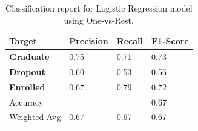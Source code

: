 \documentclass[12pt]{article}
\begin{document}
\begin{table}[h!]
  \renewcommand{\arraystretch}{1.2} %
  \centering
  \begin{tabular}{ | m{2.5cm} || m{2cm} | m{2cm} | m{2cm} | } 
    \hline
    \textbf{Target} & \textbf{Precision} & \textbf{Recall} & \textbf{F1-Score} \\ 
    \hline
    \hline
    \textbf{Graduate} & 0.75 & 0.71 & 0.73 \\ 
    \hline
    \textbf{Dropout} & 0.60 & 0.53 & 0.56 \\ 
    \hline
    \textbf{Enrolled} & 0.67 & 0.79 & 0.72 \\
    \hline
    \hline
    Accuracy & \- & \- & 0.67 \\
    \hline
    Weighted Avg & 0.67 & 0.67 & 0.67 \\
    \hline
  \end{tabular}
  \caption{Classification report for Logistic Regression model using One-vs-Rest.}
  \label{tab:logist_ovr}
\end{table}

\printbibliography[heading=bibintoc, title={References}]
\end{document}
